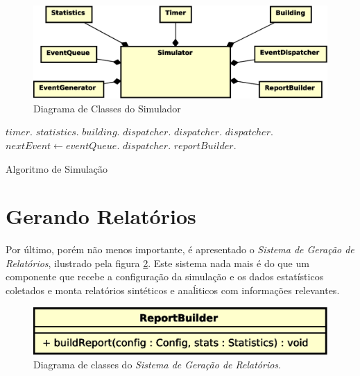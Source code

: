 \begin{figure}[htb!]
  \centering
  \includegraphics[scale=0.6]{img/Simulator.eps}
  \caption{Diagrama de Classes do Simulador}
\label{fig:diagram:simulator}
\end{figure}

\begin{algorithm}[H]
\begin{center}
\begin{algorithmic}[1]
  \State $timer.$
  \State $statistics.$
  \State $building.$
  \State $dispatcher.$
  \State $dispatcher.$
  \State $dispatcher.$
    \State $nextEvent \gets eventQueue.$
    \State $dispatcher.$
  \EndWhile
  \State $reportBuilder.$
\EndFunction
\end{algorithmic}
\end{center}
\caption
   {\label{alg:sim}Algoritmo de Simulação}
\end{algorithm}

\section{\label{sec:model:report}Gerando Relatórios}

Por último, porém não menos importante, é apresentado o \textit{Sistema de
Geração de Relatórios}, ilustrado pela figura \ref{fig:diagram:report}. Este
sistema nada mais é do que um componente que recebe a configuração da simulação
e os dados estatísticos coletados e monta relatórios sintéticos e anaĺiticos com
informações relevantes.

\begin{figure}[htb!]
  \centering
  \includegraphics[scale=0.6]{img/Report.eps}
  \caption{Diagrama de classes do \textit{Sistema de Geração de Relatórios}.}
\label{fig:diagram:report}
\end{figure}

